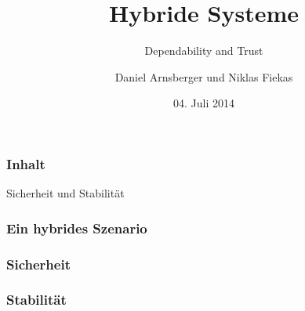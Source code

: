 \documentclass[ngerman]{beamer}
\title{Hybride Systeme}
\subtitle{Dependability and Trust}
\author{Daniel Arnsberger und Niklas Fiekas}
\institute{Institut für Informatik}
\date{04. Juli 2014}
\begin{document}
\begin{frame}
    \titlepage
\end{frame}

\begin{frame}
    \frametitle{Inhalt}
    \tableofcontents
\end{frame}

\begin{section}{Sicherheit und Stabilität}

\begin{frame}
    \frametitle{Ein hybrides Szenario}
    \begin{figure}
        \centering
        \def\svgwidth{0.9\columnwidth}
        
    \end{figure}
\end{frame}

\begin{frame}
    \frametitle{Sicherheit}
    \begin{figure}
        \centering
        \def\svgwidth{0.9\columnwidth}
        
    \end{figure}
\end{frame}

\begin{frame}
    \frametitle{Stabilität}
    \begin{figure}
        \centering
        \def\svgwidth{0.9\columnwidth}
        
    \end{figure}
\end{frame}

\end{section}
\end{document}
